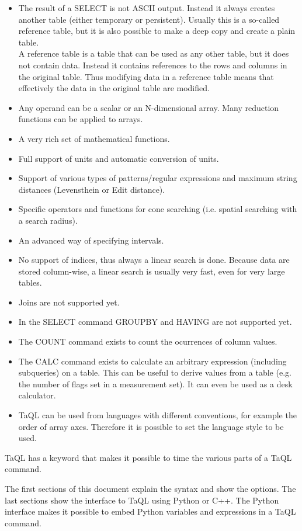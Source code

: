 \begin{itemize}
\item The result of a SELECT is not ASCII output. Instead it always
creates another table (either temporary or persistent). Usually this
is a so-called reference table, but it is also possible to make a deep
copy and create a plain table.
\\A reference table is a table that can be used as any other table,
but it does not contain data. Instead it contains references to the
rows and columns in the original table. Thus modifying data in a
reference table means that effectively the data in the original
table are modified.
\item Any operand can be a scalar or an N-dimensional array.
Many reduction functions can be applied to arrays.
\item A very rich set of mathematical functions.
\item Full support of units and automatic conversion of units.
\item Support of various types of patterns/regular expressions and
maximum string distances (Levensthein or Edit distance).
\item Specific operators and functions for cone searching
(i.e. spatial searching with a search radius).
\item An advanced way of specifying intervals.
\item No support of indices, thus always a linear search is done.
Because data are stored column-wise, a linear search is usually very
 fast, even for very large tables.
\item Joins are not supported yet.
\item In the SELECT command GROUPBY and HAVING are not supported yet.
\item The COUNT command exists to count the ocurrences of column values.
\item The CALC command exists to
calculate an arbitrary expression (including subqueries) on a
table. This can be useful to derive values from a table (e.g. the
number of flags set in a measurement set). It can even be used as a
desk calculator.
\item TaQL can be used from languages with different conventions, for
example the order of array axes. Therefore it is possible to set the
language style to be used.
\end{itemize}
TaQL has a keyword that makes it possible to time the various parts of
a TaQL command.

The first sections of this document explain the syntax and show the options.
The last sections show the interface to TaQL using Python or C++.
The Python interface makes it possible to embed Python
variables and expressions in a TaQL command.

